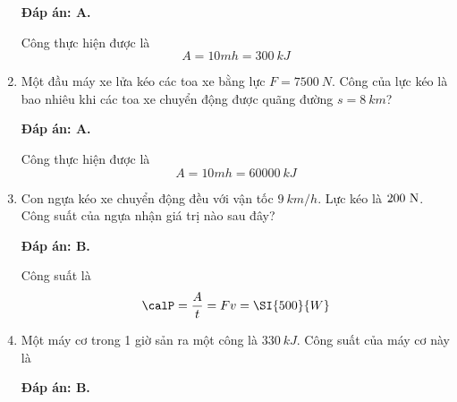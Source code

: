 \begin{enumerate}[label=\bfseries Câu \arabic*:]
	\hideall
	{\textbf{Đáp án: A.}
		
		Công thực hiện được là
		$$A=10mh=\SI{300}{kJ}$$
	}
	\item {}
	
	
	{Một đầu máy xe lửa kéo các toa xe bằng lực $F=\SI{7500}{N}$. Công của lực kéo là bao nhiêu khi các toa xe chuyển động được quãng đường $s=\SI{8}{km}$?
		
		
	}
	
	\hideall
	{\textbf{Đáp án: A.}
		
		Công thực hiện được là
		$$A=10mh=\SI{60000}{kJ}$$
	}
	\item {}
	
	
	{Con ngựa kéo xe chuyển động đều với vận tốc $\SI{9}{km/h}$. Lực kéo là $200\ \text N$. Công suất của ngựa nhận giá trị nào sau đây?
		
		
	}
	
	\hideall
	{\textbf{Đáp án: B.}
		
		Công suất là
		$$\calP = \dfrac{A}{t} = Fv=\SI{500}{W}$$
	}
	\item {}
	
	
	{Một máy cơ trong 1 giờ sản ra một công là $\SI{330}{kJ}$. Công suất của máy cơ này là
		
		
	}
	
	\hideall
	{\textbf{Đáp án: B.}
		
}
\end{enumerate}
